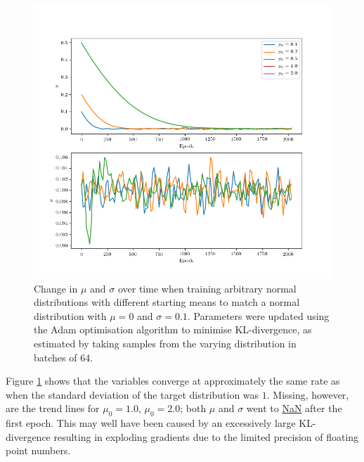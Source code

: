 \documentclass[../../main.tex]{subfiles}
\begin{document}
\begin{figure}[H]
    \begin{center}
    \includegraphics[width=\textwidth]{narrowKLDivergence}
    \caption{
        Change in $\mu$ and $\sigma$ over time when training arbitrary normal distributions with different starting means to match a normal distribution with $\mu=0$ and $\sigma=0.1$. 
        Parameters were updated using the Adam optimisation algorithm to minimise KL-divergence, as estimated by taking samples from the varying distribution in batches of 64.
    }
    \label{fig:narrowKLDivergence}
    \end{center}
\end{figure}
Figure \ref{fig:narrowKLDivergence} shows that the variables converge at approximately the same rate as when the standard deviation of the target distribution was $1$.
Missing, however, are the trend lines for $\mu_0=1.0$, $\mu_0=2.0$; both $\mu$ and $\sigma$ went to \url{NaN} after the first epoch.
This may well have been caused by an excessively large KL-divergence resulting in exploding gradients due to the limited precision of floating point numbers.
\end{document}
